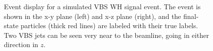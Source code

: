 \begin{figure}[htb]
    \centering
    \qquad
    \caption{
        Event display for a simulated VBS WH signal event. 
        The event is shown in the x-y plane (left) and x-z plane (right), and the final-state particles (thick red lines) are labeled with their true labels. 
        Two VBS jets can be seen very near to the beamline, going in either direction in $z$. 
    }
    \label{fig:vbswh_fireworks}
\end{figure}

\clearpage

